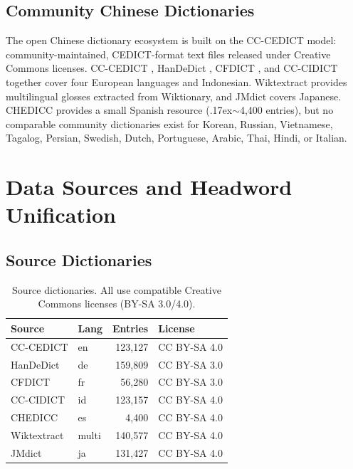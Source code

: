 \documentclass[11pt]{article}
\begin{document}
\subsection{Community Chinese Dictionaries}

The open Chinese dictionary ecosystem is built on the CC-CEDICT model: community-maintained, CEDICT-format text files released under Creative Commons licenses. CC-CEDICT \citep{cedict}, HanDeDict \citep{handedict}, CFDICT \citep{cfdict}, and CC-CIDICT \citep{cidict} together cover four European languages and Indonesian. Wiktextract \citep{wiktextract} provides multilingual glosses extracted from Wiktionary, and JMdict \citep{jmdict} covers Japanese. CHEDICC provides a small Spanish resource ({\raise.17ex\hbox{$\scriptstyle\sim$}}4,400 entries), but no comparable community dictionaries exist for Korean, Russian, Vietnamese, Tagalog, Persian, Swedish, Dutch, Portuguese, Arabic, Thai, Hindi, or Italian.


\section{Data Sources and Headword Unification}
\label{sec:data}

\subsection{Source Dictionaries}

\begin{table}[t]
\centering
\small
\begin{tabular}{llrl}
\toprule
\textbf{Source} & \textbf{Lang} & \textbf{Entries} & \textbf{License} \\
\midrule
CC-CEDICT   & en & 123,127 & CC BY-SA 4.0 \\
HanDeDict   & de & 159,809 & CC BY-SA 3.0 \\
CFDICT      & fr &  56,280 & CC BY-SA 3.0 \\
CC-CIDICT   & id & 123,157 & CC BY-SA 4.0 \\
CHEDICC     & es &   4,400 & CC BY-SA 4.0 \\
Wiktextract & multi & 140,577 & CC BY-SA 4.0 \\
JMdict      & ja & 131,427 & CC BY-SA 4.0 \\
\bottomrule
\end{tabular}
\caption{Source dictionaries. All use compatible Creative Commons licenses (BY-SA 3.0/4.0).}
\label{tab:sources}
\end{table}
\end{document}
